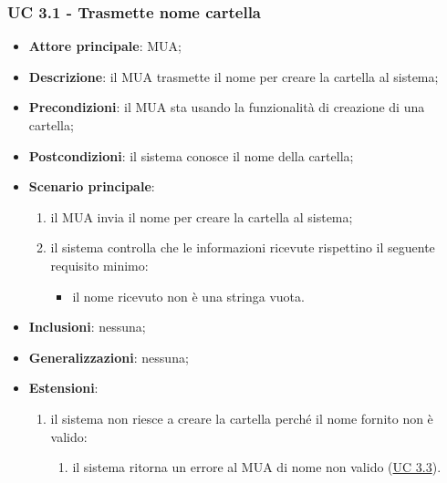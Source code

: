 \subsubsection{UC 3.1 - Trasmette nome cartella} \label{sec:UC3.1}
    \begin{itemize}
        \item \textbf{Attore principale}: MUA;
        \item \textbf{Descrizione}: il MUA trasmette il nome per creare la cartella al sistema;
        \item \textbf{Precondizioni}: il MUA sta usando la funzionalità di creazione di una cartella;
        \item \textbf{Postcondizioni}: il sistema conosce il nome della cartella;
        \item \textbf{Scenario principale}:
            \begin{enumerate}
                \item il MUA invia il nome per creare la cartella al sistema;
                \item il sistema controlla che le informazioni ricevute rispettino il seguente requisito minimo:
                \begin{itemize}
                    \item il nome ricevuto non è una stringa vuota.
                \end{itemize}
            \end{enumerate}
        \item \textbf{Inclusioni}: nessuna;
        \item \textbf{Generalizzazioni}: nessuna;
        \item \textbf{Estensioni}:
            \begin{enumerate}[label=\alph*.]
                \item il sistema non riesce a creare la cartella perché il nome fornito non è valido:
                \begin{enumerate}[label=\arabic*.]
                    \item il sistema ritorna un errore al MUA di nome non valido (\hyperref[sec:UC3.3]{UC 3.3}).
                \end{enumerate}
            \end{enumerate}
    \end{itemize}

